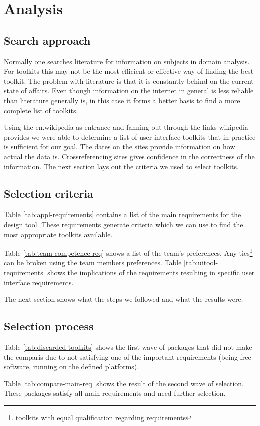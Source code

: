 \section{Analysis}

\subsection{Search approach}

Normally one searches literature for information on subjects in domain
analysis.  For toolkits this may not be the most efficient or effective way of
finding the best toolkit. The problem with literature is that it is constantly
behind on the current state of affairs. Even though information on the internet
in general is less reliable than literature generally is, in this case it forms
a better basis to find a more complete list of toolkits. 

Using the en.wikipedia as entrance and fanning out through the links wikipedia
provides we were able to determine a list of user interface toolkits that in
practice is sufficient for our goal. The dates on the sites provide information
on how actual the data is. Crossreferencing sites gives confidence in the
correctness of the information. The next section lays out the criteria we used
to select toolkits.

\subsection{Selection criteria}

Table \ref{tab:appl-requirements} contains a list of the main requirements for
the design tool. These requirements generate criteria which we can use to find
the most appropriate toolkits available.

Table \ref{tab:team-competence-req} shows a list of the team's preferences.
Any ties\footnote{toolkits with equal qualification regarding requirements} can
be broken using the team members preferences. Table
\ref{tab:uitool-requirements} shows the implications of the requirements
resulting in specific user interface requirements.

The next section shows what the steps we followed and what the results were.

\subsection{Selection process}

Table \ref{tab:discarded-toolkits} shows the first wave of packages that did
not make the comparis due to not satisfying one of the important requirements
(being free software, running on the defined platforms).

Table \ref{tab:compare-main-req} shows the result of the second wave of
selection. These packages satisfy all main requirements and need further
selection. 

